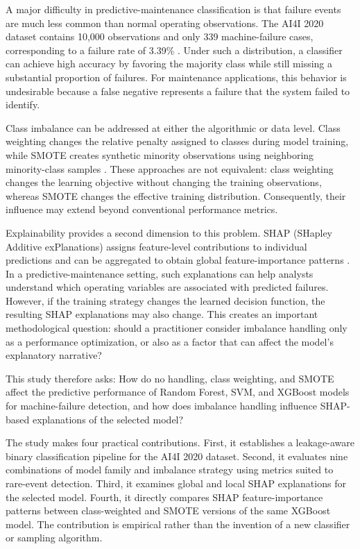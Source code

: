 \documentclass[conference]{IEEEtran}
\begin{document}
A major difficulty in predictive-maintenance classification is that failure events are much less common than normal operating observations. The AI4I 2020 dataset contains 10,000 observations and only 339 machine-failure cases, corresponding to a failure rate of 3.39\% \cite{uci2020ai4i}. Under such a distribution, a classifier can achieve high accuracy by favoring the majority class while still missing a substantial proportion of failures. For maintenance applications, this behavior is undesirable because a false negative represents a failure that the system failed to identify.

Class imbalance can be addressed at either the algorithmic or data level. Class weighting changes the relative penalty assigned to classes during model training, while SMOTE creates synthetic minority observations using neighboring minority-class samples \cite{chawla2002smote}. These approaches are not equivalent: class weighting changes the learning objective without changing the training observations, whereas SMOTE changes the effective training distribution. Consequently, their influence may extend beyond conventional performance metrics.

Explainability provides a second dimension to this problem. SHAP (SHapley Additive exPlanations) assigns feature-level contributions to individual predictions and can be aggregated to obtain global feature-importance patterns \cite{lundberg2017unified}. In a predictive-maintenance setting, such explanations can help analysts understand which operating variables are associated with predicted failures. However, if the training strategy changes the learned decision function, the resulting SHAP explanations may also change. This creates an important methodological question: should a practitioner consider imbalance handling only as a performance optimization, or also as a factor that can affect the model's explanatory narrative?

This study therefore asks: How do no handling, class weighting, and SMOTE affect the predictive performance of Random Forest, SVM, and XGBoost models for machine-failure detection, and how does imbalance handling influence SHAP-based explanations of the selected model?

The study makes four practical contributions. First, it establishes a leakage-aware binary classification pipeline for the AI4I 2020 dataset. Second, it evaluates nine combinations of model family and imbalance strategy using metrics suited to rare-event detection. Third, it examines global and local SHAP explanations for the selected model. Fourth, it directly compares SHAP feature-importance patterns between class-weighted and SMOTE versions of the same XGBoost model. The contribution is empirical rather than the invention of a new classifier or sampling algorithm.
\end{document}
